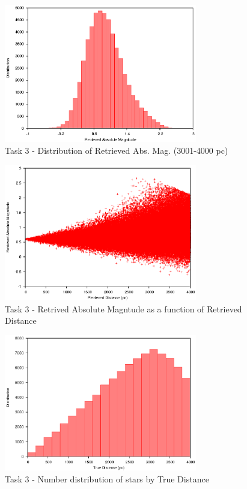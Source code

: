 \documentclass[a4paper,12pt]{article}
\begin{document}
\begin{figure}[H]
\centering
\includegraphics[width=0.75\textwidth]{./Task3/Bin4}
\caption{Task 3 - Distribution of Retrieved Abs. Mag. (3001-4000 pc)}
\label{fig:t3bin4}
\end{figure}

\begin{figure}[H]
\centering
\includegraphics[width=0.75\textwidth]{./Task3/Graph1}
\caption{Task 3 - Retrived Absolute Magntude as a function of Retrieved Distance}
\label{fig:t3graph1}
\end{figure}

\begin{figure}[H]
\centering
\includegraphics[width=0.75\textwidth]{./Task3/Graph2}
\caption{Task 3 - Number distribution of stars by True Distance}
\label{fig:t3graph2}
\end{figure}
\end{document}

